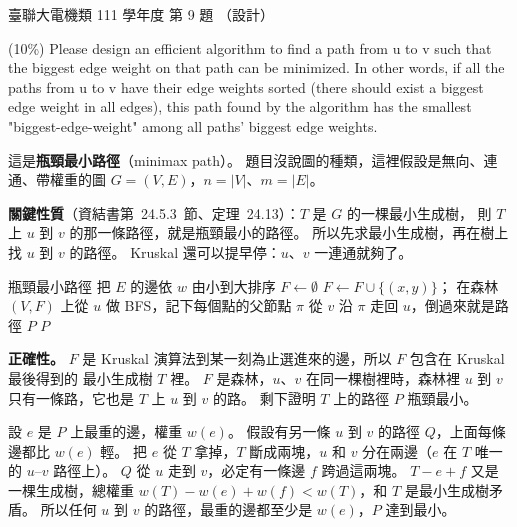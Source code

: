 \begin{pastexam}[label={px:ust-111-ee-ds-09}]{臺聯大電機類 111 學年度 第 9 題}
（設計）

(10\%) Please design an efficient algorithm to find a path from u to v such that the biggest edge
weight on that path can be minimized. In other words, if all the paths from u to v have their edge
weights sorted (there should exist a biggest edge weight in all edges), this path found by the
algorithm has the smallest "biggest-edge-weight" among all paths' biggest edge weights.
\end{pastexam}

\begin{pastsoln}
這是\textbf{瓶頸最小路徑}（minimax path）。 題目沒說圖的種類，這裡假設是無向、連通、帶權重的圖
$G = (V, E)$，$n = |V|$、$m = |E|$。

\textbf{關鍵性質}（資結書第~24.5.3~節、定理~24.13）：$T$ 是 $G$ 的一棵最小生成樹，
則 $T$ 上 $u$ 到 $v$ 的那一條路徑，就是瓶頸最小的路徑。 所以先求最小生成樹，再在樹上找 $u$ 到 $v$
的路徑。 Kruskal 還可以提早停：$u$、$v$ 一連通就夠了。

\begin{pseudo}{瓶頸最小路徑}
    \State 把 $E$ 的邊依 $w$ 由小到大排序
        \State {}
    \EndFor
    \State $F \gets \emptyset$
            \State \Break {}
        \EndIf
            \State $F \gets F \cup \{(x, y)\}$；
        \EndIf
    \EndFor
        \State \Return \NIL {}
    \EndIf
    \State 在森林 $(V, F)$ 上從 $u$ 做 BFS，記下每個點的父節點 $\pi$
    \State 從 $v$ 沿 $\pi$ 走回 $u$，倒過來就是路徑 $P$
    \State \Return $P$
\EndFunction
\end{pseudo}

\textbf{正確性。} $F$ 是 Kruskal 演算法到某一刻為止選進來的邊，所以 $F$ 包含在 Kruskal 最後得到的
最小生成樹 $T$ 裡。 $F$ 是森林，$u$、$v$ 在同一棵樹裡時，森林裡 $u$ 到 $v$ 只有一條路，它也是 $T$ 上
$u$ 到 $v$ 的路。 剩下證明 $T$ 上的路徑 $P$ 瓶頸最小。

設 $e$ 是 $P$ 上最重的邊，權重 $w(e)$。 假設有另一條 $u$ 到 $v$ 的路徑 $Q$，上面每條邊都比 $w(e)$ 輕。
把 $e$ 從 $T$ 拿掉，$T$ 斷成兩塊，$u$ 和 $v$ 分在兩邊（$e$ 在 $T$ 唯一的 $u$--$v$ 路徑上）。 $Q$ 從 $u$
走到 $v$，必定有一條邊 $f$ 跨過這兩塊。 $T - e + f$ 又是一棵生成樹，總權重
$w(T) - w(e) + w(f) < w(T)$，和 $T$ 是最小生成樹矛盾。 所以任何 $u$ 到 $v$ 的路徑，最重的邊都至少是
$w(e)$，$P$ 達到最小。


\end{pastsoln}
